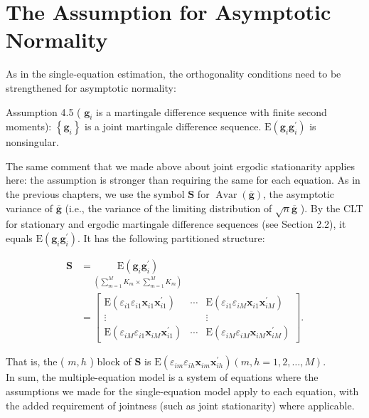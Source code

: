 \documentclass[10pt]{article}
\begin{document}
\section*{The Assumption for Asymptotic Normality}
As in the single-equation estimation, the orthogonality conditions need to be strengthened for asymptotic normality:

Assumption 4.5 ( $\mathbf{g}_{i}$ is a martingale difference sequence with finite second moments): $\left\{\mathbf{g}_{i}\right\}$ is a joint martingale difference sequence. $\mathrm{E}\left(\mathbf{g}_{i} \mathbf{g}_{i}^{\prime}\right)$ is nonsingular.

The same comment that we made above about joint ergodic stationarity applies here: the assumption is stronger than requiring the same for each equation. As in the previous chapters, we use the symbol $\mathbf{S}$ for $\operatorname{Avar}(\overline{\mathbf{g}})$, the asymptotic variance of $\overline{\mathbf{g}}$ (i.e., the variance of the limiting distribution of $\sqrt{n} \overline{\mathbf{g}}$ ). By the CLT for stationary and ergodic martingale difference sequences (see Section 2.2), it equals $\mathrm{E}\left(\mathbf{g}_{i} \mathbf{g}_{i}^{\prime}\right)$. It has the following partitioned structure:


\begin{align*}
\mathbf{S} & =\underset{\left(\sum_{m=1}^{M} K_{m} \times \sum_{m=1}^{M} K_{m}\right)}{\mathrm{E}\left(\mathbf{g}_{i} \mathbf{g}_{i}^{\prime}\right)} \\
& =\left[\begin{array}{ccc}
\mathrm{E}\left(\varepsilon_{i 1} \varepsilon_{i 1} \mathbf{x}_{i 1} \mathbf{x}_{i 1}^{\prime}\right) & \cdots & \mathrm{E}\left(\varepsilon_{i 1} \varepsilon_{i M} \mathbf{x}_{i 1} \mathbf{x}_{i M}^{\prime}\right) \\
\vdots & & \vdots \\
\mathrm{E}\left(\varepsilon_{i M} \varepsilon_{i 1} \mathbf{x}_{i M} \mathbf{x}_{i 1}^{\prime}\right) & \cdots & \mathrm{E}\left(\varepsilon_{i M} \varepsilon_{i M} \mathbf{x}_{i M} \mathbf{x}_{i M}^{\prime}\right)
\end{array}\right] . \tag{4.1.11}
\end{align*}


That is, the ( $m, h$ ) block of $\mathbf{S}$ is $\mathrm{E}\left(\varepsilon_{i m} \varepsilon_{i h} \mathbf{x}_{i m} \mathbf{x}_{i h}^{\prime}\right)(m, h=1,2, \ldots, M)$.\\
In sum, the multiple-equation model is a system of equations where the assumptions we made for the single-equation model apply to each equation, with the added requirement of jointness (such as joint stationarity) where applicable.
\end{document}

